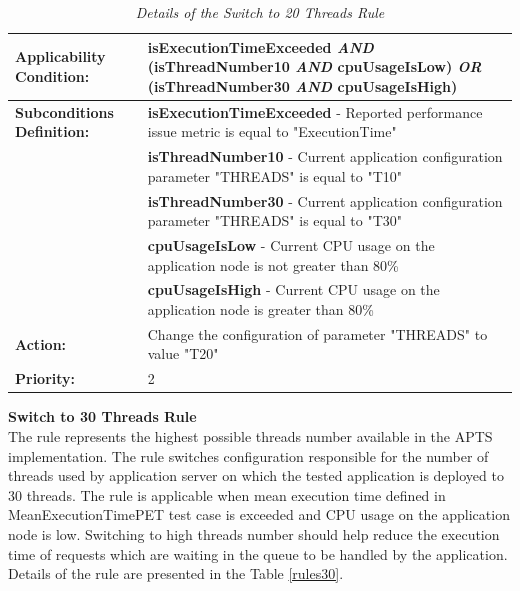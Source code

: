 \documentclass[12pt,a4paper]{article}
\begin{document}
\begin{table}[!htb]
\begin{center}
\begin{tabularx}{\textwidth}{l|X}
\textbf{Applicability Condition:} & \textbf{isExecutionTimeExceeded} \textit{AND} \newline
(\textbf{isThreadNumber10} \textit{AND} \textbf{cpuUsageIsLow}) \textit{OR} \newline
(\textbf{isThreadNumber30} \textit{AND} \textbf{cpuUsageIsHigh}) \\ \hline

\textbf{Subconditions Definition:} & \textbf{isExecutionTimeExceeded} -  Reported performance issue metric is equal to "ExecutionTime"  \\
& \textbf{isThreadNumber10} -  Current application configuration parameter "THREADS" is equal to "T10" \\
& \textbf{isThreadNumber30} -  Current application configuration parameter "THREADS" is equal to "T30" \\
& \textbf{cpuUsageIsLow} - Current CPU usage on the application node is not greater than 80\% \\ \hline
& \textbf{cpuUsageIsHigh} - Current CPU usage on the application node is greater than 80\% \\ \hline

\textbf{Action:} & Change the configuration of parameter "THREADS" to value "T20" \\ \hline
\textbf{Priority:} & 2\\
\end{tabularx}
\end{center}
\caption{\textit{Details of the Switch to 20 Threads Rule}} \label{rules20}
\end{table}

\vspace{5mm}
\noindent\textbf{Switch to 30 Threads Rule} \\
The rule represents the highest possible threads number available in the APTS implementation. The rule switches configuration responsible for the number of threads used by application server on which the tested application is deployed to 30 threads. The rule is applicable when mean execution time defined in MeanExecutionTimePET test case is exceeded and CPU usage on the application node is low. Switching to high threads number should help reduce the execution time of requests which are waiting in the queue to be handled by the application. Details of the rule are presented in the Table \ref{rules30}.
\end{document}
